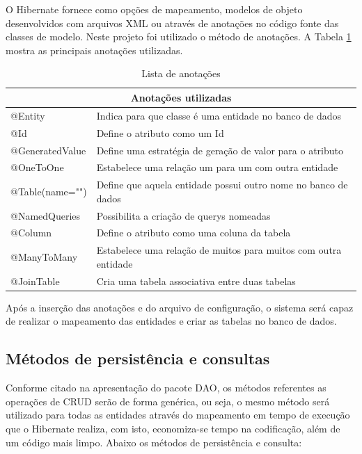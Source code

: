    
    O Hibernate fornece como opções de mapeamento, modelos de objeto desenvolvidos com arquivos XML ou através de anotações no código fonte das classes de modelo. Neste projeto foi utilizado o método de anotações. A Tabela \ref{tab:anotacoes} mostra as principais anotações utilizadas.

\begin{table}[htp]
\caption{Lista de anotações}
\label{tab:anotacoes}
\begin{tabular}{|l|l|}
\hline
\multicolumn{2}{|c|}{Anotações utilizadas}                                        \\ \hline
@Entity         & Indica para que classe é uma entidade no banco de dados         \\ \hline
@Id             & Define o atributo como um Id                                    \\ \hline
@GeneratedValue & Define uma estratégia de geração de valor para o atributo       \\ \hline
@OneToOne       & Estabelece uma relação um para um com outra entidade            \\ \hline
@Table(name="") & Define que aquela entidade possui outro nome no banco de dados  \\ \hline
@NamedQueries   & Possibilita a criação de querys nomeadas                        \\ \hline
@Column         & Define o atributo como uma coluna da tabela                     \\ \hline
@ManyToMany     & Estabelece uma relação de muitos para muitos com outra entidade \\ \hline
@JoinTable      & Cria uma tabela associativa entre duas tabelas                  \\ \hline
\end{tabular}
\end{table}
 
 Após a inserção das anotações e do arquivo de configuração, o sistema será capaz de realizar o mapeamento das entidades e criar as tabelas no banco de dados.
    
    
  \subsection{Métodos de persistência e consultas}
    Conforme citado na apresentação do pacote DAO, os métodos referentes as operações de CRUD serão de forma genérica, ou seja, o mesmo método será utilizado para todas as entidades através do mapeamento em tempo de execução que o Hibernate realiza, com isto, economiza-se tempo na codificação, além de um código mais limpo. Abaixo os métodos de persistência e consulta:
    
